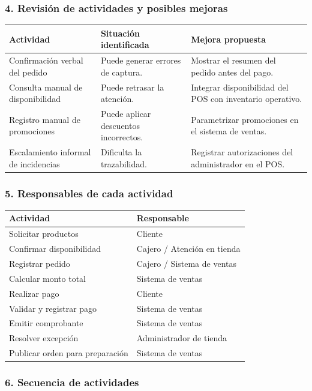 \documentclass[a4paper,12pt]{article}
\begin{document}
\subsubsection*{4. Revisión de actividades y posibles mejoras}

\begin{longtable}{P{5cm} P{4cm} P{5cm}}
\toprule
\textbf{Actividad} & \textbf{Situación identificada} & \textbf{Mejora propuesta} \\
\midrule
Confirmación verbal del pedido & Puede generar errores de captura. & Mostrar el resumen del pedido antes del pago. \\
Consulta manual de disponibilidad & Puede retrasar la atención. & Integrar disponibilidad del POS con inventario operativo. \\
Registro manual de promociones & Puede aplicar descuentos incorrectos. & Parametrizar promociones en el sistema de ventas. \\
Escalamiento informal de incidencias & Dificulta la trazabilidad. & Registrar autorizaciones del administrador en el POS. \\
\bottomrule
\end{longtable}

\subsubsection*{5. Responsables de cada actividad}

\begin{longtable}{P{7cm} P{7cm}}
\toprule
\textbf{Actividad} & \textbf{Responsable} \\
\midrule
Solicitar productos & Cliente \\
Confirmar disponibilidad & Cajero / Atención en tienda \\
Registrar pedido & Cajero / Sistema de ventas \\
Calcular monto total & Sistema de ventas \\
Realizar pago & Cliente \\
Validar y registrar pago & Sistema de ventas \\
Emitir comprobante & Sistema de ventas \\
Resolver excepción & Administrador de tienda \\
Publicar orden para preparación & Sistema de ventas \\
\bottomrule
\end{longtable}

\subsubsection*{6. Secuencia de actividades}
\end{document}
